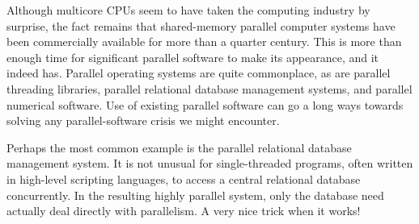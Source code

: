 Although multicore CPUs seem to have taken the computing industry
by surprise, the fact remains that shared-memory parallel computer
systems have been commercially available for more than a quarter
century.
This is more than enough time for significant parallel software
to make its appearance, and it indeed has.
Parallel operating systems are quite commonplace, as are parallel
threading libraries, parallel relational database management systems, 
and parallel numerical software.
Use of existing parallel software can go a long ways towards solving any
parallel-software crisis we might encounter.

Perhaps the most common example is the parallel relational database
management system.
It is not unusual for single-threaded programs, often written in
high-level scripting languages, to access a central relational
database concurrently.
In the resulting highly parallel system, only the database need actually
deal directly with parallelism.
A very nice trick when it works!
